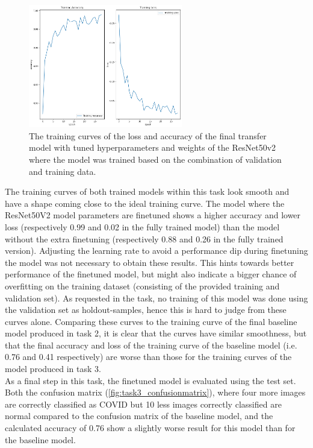 \documentclass[conference]{IEEEtran}
\begin{document}
\begin{figure}[p] \centering \includegraphics[width=0.6\textwidth]{fig_task3_training_curves_train_model_finetuned_resnet.png} 
	\caption{The training curves of the loss and accuracy of the final transfer model with tuned hyperparameters and weights of the ResNet50v2 where the model was trained based on the combination of validation and training data.} 
	\label{fig:task3_curves_final_resnet} 
\end{figure}
The training curves of both trained models within this task look smooth and have a shape coming close to the ideal training curve. 
The model where the ResNet50V2 model parameters are finetuned shows a higher accuracy and lower loss (respectively 0.99 and 0.02 in the fully trained model) than the model without the extra finetuning (respectively 0.88 and 0.26 in the fully trained version). Adjusting the learning rate to avoid a performance dip during finetuning the model was not necessary to obtain these results.
This hints towards better performance of the finetuned model, but might also indicate a bigger chance of overfitting on the training dataset (consisting of the provided training and validation set). As requested in the task, no training of this model was done using the validation set as holdout-samples, hence this is hard to judge from these curves alone.
Comparing these curves to the training curve of the final baseline model produced in task 2, it is clear that the curves have similar smoothness, but that the final accuracy and loss of the training curve of the baseline model (i.e. 0.76 and 0.41 respectively) are worse than those for the training curves of the model produced in task 3.\\
As a final step in this task, the finetuned model is evaluated using the test set. Both the confusion matrix (\ref{fig:task3_confusionmatrix}), where four more images are correctly classified as COVID but 10 less images correctly classified are normal compared to the confusion matrix of the baseline model, and the calculated accuracy of 0.76 show a slightly worse result for this model than for the baseline model. 
\end{document}
